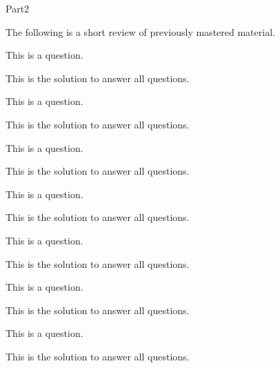 \documentclass[12pt]{article}
\begin{document}
\begin{exam}[Part II.]{Part2}

\begin{instructions}[Part II.]
The following is a short review of previously mastered material.
\end{instructions}

\begin{problem}[5]
This is a question.
\begin{solution}[.5in]
This is the solution to answer all questions.
\end{solution}
\end{problem}

\begin{problem}[7]
This is a question.
\begin{solution}[.5in]
This is the solution to answer all questions.
\end{solution}
\end{problem}

\begin{problem}[8]
This is a question.
\begin{solution}[1in]
This is the solution to answer all questions.
\end{solution}
\end{problem}

\begin{problem}[5]
This is a question.
\begin{solution}[1in]
This is the solution to answer all questions.
\end{solution}
\end{problem}

\begin{problem}[10]
This is a question.
\begin{solution}[1in]
This is the solution to answer all questions.
\end{solution}
\end{problem}

\begin{problem}[5]
This is a question.
\begin{solution}[1in]
This is the solution to answer all questions.
\end{solution}
\end{problem}

\begin{problem}[10]
This is a question.
\begin{solution}[1in]
This is the solution to answer all questions.
\end{solution}
\end{problem}
\end{exam}
\end{document}
